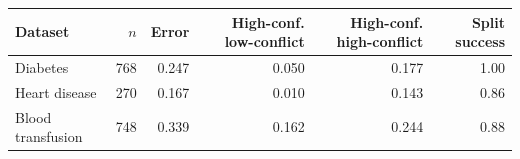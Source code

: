 \begin{tabular}{lrrrrr}
\toprule
Dataset & $n$ & Error & High-conf. low-conflict & High-conf. high-conflict & Split success \\
\midrule
Diabetes & 768 & 0.247 & 0.050 & 0.177 & 1.00 \\
Heart disease & 270 & 0.167 & 0.010 & 0.143 & 0.86 \\
Blood transfusion & 748 & 0.339 & 0.162 & 0.244 & 0.88 \\
\bottomrule
\end{tabular}
